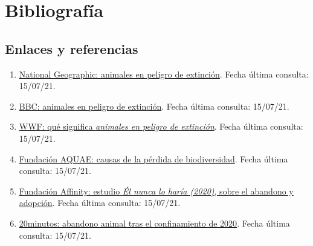\documentclass[12pt]{article}
\begin{document}
	\pagebreak
	
	\section*{Bibliografía}
	
	   \subsection*{Enlaces y referencias}
		\begin{enumerate}
			\item 
			\label{bib: enlace National Geographic} \href{https://www.nationalgeographic.com.es/naturaleza/grandes-reportajes/animales-peligro-extincion_12536}{National Geographic: animales en peligro de extinción}. Fecha última consulta: 15/07/21.
			
			\item 
			\label{bib: enlace BBC}
			\href{https://www.bbc.com/mundo/noticias-54036796}{BBC: animales en peligro de extinción}. Fecha última consulta: 15/07/21.
			
			\item 
			\label{bib: enlace WWF}
			\href{https://www.worldwildlife.org/descubre-wwf/historias/que-significa-especie-en-peligro-de-extincion}{WWF: qué significa \textit{animales en peligro de extinción}}. Fecha última consulta: 15/07/21.
			
			\item
			\label{bib: enlace Fundación AQUAE}
			\href{https://www.fundacionaquae.org/causas-perdida-biodiversidad/}{Fundación AQUAE: causas de la pérdida de biodiversidad}. Fecha última consulta: 15/07/21.
			
			\item
			\label{bib: enlace Fundación Affinity} \href{https://www.fundacion-affinity.org/observatorio/infografia-el-nunca-lo-haria-estudio-de-abandono-y-adopcion-2020}{Fundación Affinity: estudio \textit{Él nunca lo haría (2020)}, sobre el abandono y adopción}. Fecha última consulta: 15/07/21.
			
			\item
			\label{bib: enlace 20 minutos} \href{https://www.20minutos.es/noticia/4318383/0/el-abandono-animal-en-espana-aumenta-un-25-en-las-ultimas-semanas/}{20minutos: abandono animal tras el confinamiento de 2020}. Fecha última consulta: 15/07/21.
			

\end{enumerate}
\end{document}
